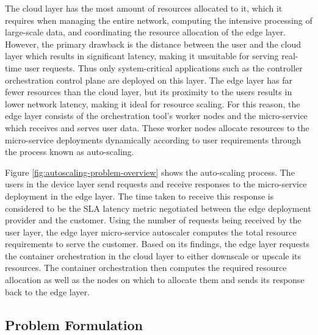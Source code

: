 The cloud layer has the most amount of resources allocated to it, which it requires when managing the entire network, computing the intensive processing of large-scale data, and coordinating the resource allocation of the edge layer. However, the primary drawback is the distance between the user and the cloud layer which results in significant latency, making it unsuitable for serving real-time user requests. Thus only system-critical applications such as the controller orchestration control plane are deployed on this layer. The edge layer has far fewer resources than the cloud layer, but its proximity to the users results in lower network latency, making it ideal for resource scaling. For this reason, the edge layer consists of the orchestration tool's worker nodes and the micro-service which receives and serves user data. These worker nodes allocate resources to the micro-service deployments dynamically according to user requirements through the process known as auto-scaling.\par

Figure \ref{fig:autoscaling-problem-overview} shows the auto-scaling process. The users in the device layer send requests and receive responses to the micro-service deployment in the edge layer. The time taken to receive this response is considered to be the SLA latency metric negotiated between the edge deployment provider and the customer. Using the number of requests being received by the user layer, the edge layer micro-service autoscaler computes the total resource requirements to serve the customer. Based on its findings, the edge layer requests the container orchestration in the cloud layer to either downscale or upscale its resources. The container orchestration then computes the required resource allocation as well as the nodes on which to allocate them and sends its response back to the edge layer.\par

\subsection{Problem Formulation}
\label{subsec:ch4-problem-formulation}

